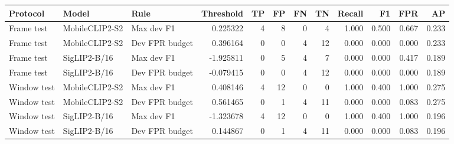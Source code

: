 \begin{longtable}{lllrrrrrrrrr}
\toprule
Protocol & Model & Rule & Threshold & TP & FP & FN & TN & Recall & F1 & FPR & AP \\
\midrule\endhead
Frame test & MobileCLIP2-S2 & Max dev F1 & 0.225322 & 4 & 8 & 0 & 4 & 1.000 & 0.500 & 0.667 & 0.233 \\
Frame test & MobileCLIP2-S2 & Dev FPR budget & 0.396164 & 0 & 0 & 4 & 12 & 0.000 & 0.000 & 0.000 & 0.233 \\
Frame test & SigLIP2-B/16 & Max dev F1 & -1.925811 & 0 & 5 & 4 & 7 & 0.000 & 0.000 & 0.417 & 0.189 \\
Frame test & SigLIP2-B/16 & Dev FPR budget & -0.079415 & 0 & 0 & 4 & 12 & 0.000 & 0.000 & 0.000 & 0.189 \\
Window test & MobileCLIP2-S2 & Max dev F1 & 0.408146 & 4 & 12 & 0 & 0 & 1.000 & 0.400 & 1.000 & 0.275 \\
Window test & MobileCLIP2-S2 & Dev FPR budget & 0.561465 & 0 & 1 & 4 & 11 & 0.000 & 0.000 & 0.083 & 0.275 \\
Window test & SigLIP2-B/16 & Max dev F1 & -1.323678 & 4 & 12 & 0 & 0 & 1.000 & 0.400 & 1.000 & 0.196 \\
Window test & SigLIP2-B/16 & Dev FPR budget & 0.144867 & 0 & 1 & 4 & 11 & 0.000 & 0.000 & 0.083 & 0.196 \\
\bottomrule
\end{longtable}
